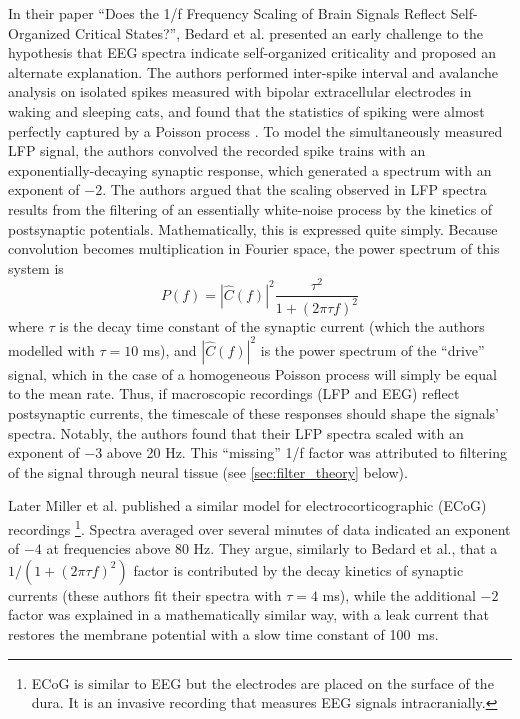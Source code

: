 In their paper ``Does the 1/f Frequency Scaling of Brain Signals Reflect Self-Organized Critical States?'', Bedard et al.\cite{Bedard2006} presented an early challenge to the hypothesis that EEG spectra indicate self-organized criticality and proposed an alternate explanation. The authors performed inter-spike interval and avalanche analysis on isolated spikes measured with bipolar extracellular electrodes in waking and sleeping cats, and found that the statistics of spiking were almost perfectly captured by a Poisson process \cite{Bedard2006}. To model the simultaneously measured LFP signal, the authors convolved the recorded spike trains with an exponentially-decaying synaptic response, which generated a spectrum with an exponent of $-2$. The authors argued that the scaling observed in LFP spectra results from the filtering of an essentially white-noise process by the kinetics of postsynaptic potentials. Mathematically, this is expressed quite simply. Because convolution becomes multiplication in Fourier space, the power spectrum of this system is
\begin{equation}
P(f) =|\hat{C}(f)|^2 \frac{\tau^2} { 1+ (2\pi\tau f)^2}
\end{equation}
where $\tau$ is the decay time constant of the synaptic current (which the authors modelled with $\tau=10$ \unit{\milli\second}), and $|\hat{C}(f)|^2$ is the power spectrum of the ``drive'' signal, which in the case of a homogeneous Poisson process will simply be equal to the mean rate. Thus, if macroscopic recordings (LFP and EEG) reflect postsynaptic currents, the timescale of these responses should shape the signals' spectra. Notably, the authors found that their LFP spectra scaled with an exponent of $-3$ above 20 Hz. This ``missing'' 1/f factor was attributed to filtering of the signal through neural tissue (see \autoref{sec:filter_theory} below).

Later Miller et al. \cite{Miller2009} published a similar model for electrocorticographic (ECoG) recordings \footnote[2]{ECoG is similar to EEG but the electrodes are placed on the surface of the dura. It is an invasive recording that measures EEG signals intracranially.}. Spectra averaged over several minutes of data indicated an exponent of $-4$ at frequencies above 80 Hz. They argue, similarly to Bedard et al., that a $1 / (1+ (2\pi\tau f)^2)$ factor is contributed by the decay kinetics of synaptic currents (these authors fit their spectra with $\tau=4$ \unit{\milli\second}), while the additional $-2$ factor was explained in a mathematically similar way, with a leak current that restores the membrane potential with a slow time constant of \qty{100}{\milli\second}.

